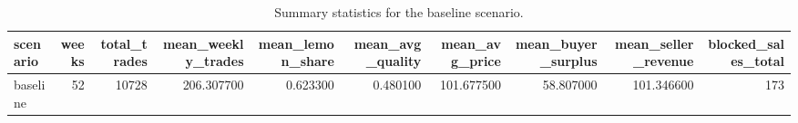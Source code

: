 \begin{table}
\caption{Summary statistics for the baseline scenario.}
\label{tab:baseline_summary}
\begin{tabular}{lrrrrrrrrr}
\toprule
scenario & weeks & total\_trades & mean\_weekly\_trades & mean\_lemon\_share & mean\_avg\_quality & mean\_avg\_price & mean\_buyer\_surplus & mean\_seller\_revenue & blocked\_sales\_total \\
\midrule
baseline & 52 & 10728 & 206.307700 & 0.623300 & 0.480100 & 101.677500 & 58.807000 & 101.346600 & 173 \\
\bottomrule
\end{tabular}
\end{table}
